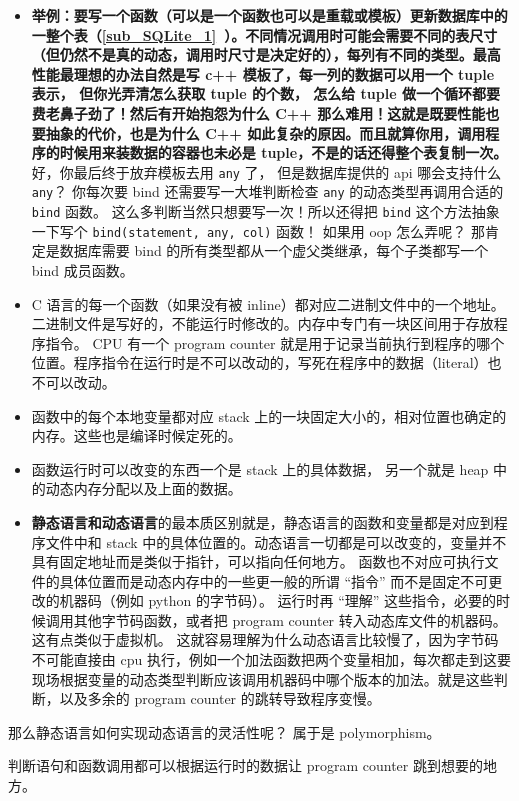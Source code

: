 \begin{itemize}
\item \textbf{举例：要写一个函数（可以是一个函数也可以是重载或模板）更新数据库中的一整个表（\autoref{sub_SQLite_1}~）。不同情况调用时可能会需要不同的表尺寸（但仍然不是真的动态，调用时尺寸是决定好的），每列有不同的类型。最高性能最理想的办法自然是写 c++ 模板了，每一列的数据可以用一个 tuple 表示， 但你光弄清怎么获取 tuple 的个数， 怎么给 tuple 做一个循环都要费老鼻子劲了！然后有开始抱怨为什么 C++ 那么难用！这就是既要性能也要抽象的代价，也是为什么 C++ 如此复杂的原因。而且就算你用，调用程序的时候用来装数据的容器也未必是 tuple，不是的话还得整个表复制一次。} 好，你最后终于放弃模板去用 \verb`any` 了， 但是数据库提供的 api 哪会支持什么 \verb`any`？ 你每次要 bind 还需要写一大堆判断检查 \verb`any` 的动态类型再调用合适的 \verb`bind` 函数。 这么多判断当然只想要写一次！所以还得把 \verb`bind` 这个方法抽象一下写个 \verb`bind(statement, any, col)` 函数！ 如果用 oop 怎么弄呢？ 那肯定是数据库需要 bind 的所有类型都从一个虚父类继承，每个子类都写一个 bind 成员函数。
\item C 语言的每一个函数（如果没有被 inline）都对应二进制文件中的一个地址。 二进制文件是写好的，不能运行时修改的。内存中专门有一块区间用于存放程序指令。 CPU 有一个 program counter 就是用于记录当前执行到程序的哪个位置。程序指令在运行时是不可以改动的，写死在程序中的数据（literal）也不可以改动。
\item 函数中的每个本地变量都对应 stack 上的一块固定大小的，相对位置也确定的内存。这些也是编译时候定死的。
\item 函数运行时可以改变的东西一个是 stack 上的具体数据， 另一个就是 heap 中的动态内存分配以及上面的数据。
\item \textbf{静态语言和动态语言}的最本质区别就是，静态语言的函数和变量都是对应到程序文件中和 stack 中的具体位置的。动态语言一切都是可以改变的，变量并不具有固定地址而是类似于指针，可以指向任何地方。 函数也不对应可执行文件的具体位置而是动态内存中的一些更一般的所谓 “指令” 而不是固定不可更改的机器码（例如 python 的字节码）。 运行时再 “理解” 这些指令，必要的时候调用其他字节码函数，或者把 program counter 转入动态库文件的机器码。 这有点类似于虚拟机。 这就容易理解为什么动态语言比较慢了，因为字节码不可能直接由 cpu 执行，例如一个加法函数把两个变量相加，每次都走到这要现场根据变量的动态类型判断应该调用机器码中哪个版本的加法。就是这些判断，以及多余的 program counter 的跳转导致程序变慢。
\end{itemize}

那么静态语言如何实现动态语言的灵活性呢？ 属于是 polymorphism。

判断语句和函数调用都可以根据运行时的数据让 program counter 跳到想要的地方。

